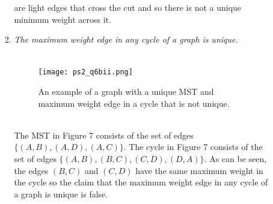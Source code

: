 \documentclass[12pt]{article}
\begin{document}
\begin{enumerate}
\begin{enumerate}
\begin{enumerate}
						are light edges that cross the cut and so there is not a unique minimum weight across it.\\
						\item \textit{The maximum weight edge in any cycle of a graph is unique.}\\
						\\
						\begin{figure}[h]
						\caption{An example of a graph with a unique MST and maximum weight edge in a cycle that is not unique.}
						\texttt{[image: ps2\_q6bii.png]}
						\centering
						\end{figure}
						\\
						The MST in Figure 7 consists of the set of edges $\{(A,B),(A,D),(A,C)\}$.  The cycle in Figure 7 consists of the set of edges $\{(A,B),(B,C),(C,D),(D,A)\}$.  
						As can be seen, the edges $(B,C)$ and $(C,D)$ have the same maximum weight in the cycle so the claim that the maximum weight edge in any cycle of a graph is unique is false.  
					\end{enumerate}
			\end{enumerate}
			

\end{enumerate}
\end{document}
